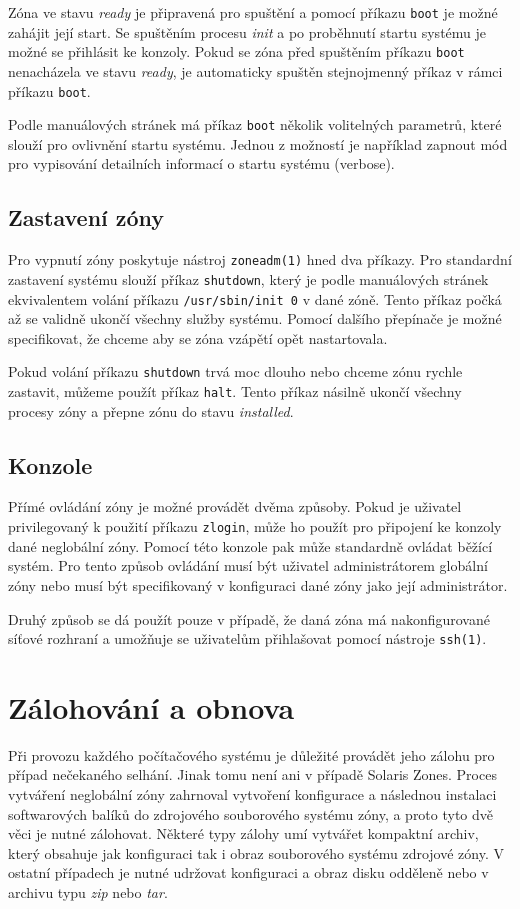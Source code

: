 Zóna ve stavu \textit{ready} je připravená pro spuštění a pomocí příkazu \verb|boot| je možné zahájit její start. Se spuštěním
procesu \textit{init} a po proběhnutí startu systému je možné se přihlásit ke konzoly. Pokud se zóna před spuštěním příkazu
\verb|boot| nenacházela ve stavu \textit{ready}, je automaticky spuštěn stejnojmenný příkaz v rámci příkazu \verb|boot|.

Podle manuálových stránek \cite{oracle:manpages:zoneadm} má příkaz \verb|boot| několik volitelných parametrů, které slouží
pro ovlivnění startu systému. Jednou z možností je například zapnout mód pro vypisování detailních informací o startu systému
(verbose).
\subsection{Zastavení zóny}
\label{chapter:zones:management:stop}
Pro vypnutí zóny poskytuje nástroj \verb|zoneadm(1)| hned dva příkazy. Pro standardní zastavení systému slouží příkaz \verb|shutdown|,
který je podle manuálových stránek \cite{oracle:manpages:zoneadm} ekvivalentem volání příkazu \verb|/usr/sbin/init 0| v dané zóně.
Tento příkaz počká až se validně ukončí všechny služby systému. Pomocí dalšího přepínače je možné specifikovat, že chceme aby
se zóna vzápětí opět nastartovala.

Pokud volání příkazu \verb|shutdown| trvá moc dlouho nebo chceme zónu rychle zastavit, můžeme použít příkaz \verb|halt|. Tento
příkaz násilně ukončí všechny procesy zóny a přepne zónu do stavu \textit{installed}.
\subsection{Konzole}
\label{chapter:zones:management:console}
Přímé ovládání zóny je možné provádět dvěma způsoby. Pokud je uživatel privilegovaný k použití příkazu \verb|zlogin|, může ho
použít pro připojení ke konzoly dané neglobální zóny. Pomocí této konzole pak může standardně ovládat běžící systém. Pro tento
způsob ovládání musí být uživatel administrátorem globální zóny nebo musí být specifikovaný v konfiguraci dané zóny jako její
administrátor.

Druhý způsob se dá použít pouze v případě, že daná zóna má nakonfigurované síťové rozhraní a umožňuje se uživatelům přihlašovat
pomocí nástroje \verb|ssh(1)|.
\section{Zálohování a obnova}
\label{chapter:zones:backup}
Při provozu každého počítačového systému je důležité provádět jeho zálohu pro případ nečekaného selhání. Jinak tomu není ani
v případě Solaris Zones. Proces vytváření neglobální zóny zahrnoval vytvoření konfigurace a následnou instalaci softwarových
balíků do zdrojového souborového systému zóny, a proto tyto dvě věci je nutné zálohovat. Některé typy zálohy umí vytvářet kompaktní
archiv, který obsahuje jak konfiguraci tak i obraz souborového systému zdrojové zóny. V ostatní případech je nutné udržovat
konfiguraci a obraz disku odděleně nebo v archivu typu \textit{zip} nebo \textit{tar}. 
